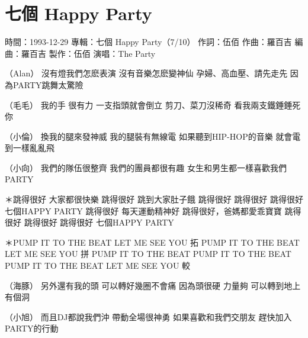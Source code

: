 \documentclass[UTF8,a4paper,oneside,twocolumn,12pt]{ctexbook}
\newcommand{\infopair}[2]{\textbullet #1：#2}
\newcommand{\zc}[1][伍佰]{\infopair{作詞}{#1}}
\newcommand{\zq}[1][伍佰]{\infopair{作曲}{#1}}
\newcommand{\bq}[1][伍佰]{\infopair{編曲}{#1}}
\newcommand{\zj}[1]{\infopair{專輯}{#1}}
\newcommand{\zz}[1]{\infopair{製作}{#1}}
\newcommand{\sj}[1]{\infopair{時間}{#1}}
\newenvironment{info}{\begin{flushleft}\kaishu
	}
	{\end{flushleft}\normalsize\yahei\par}
\newenvironment{lyric}{
	}
{}
\begin{document}
\section{七個 Happy Party}
\begin{info}
	\sj{1993-12-29}
	\zj{七個 Happy Party（7/10）}
	\zc
	\zq[羅百吉]
	\bq[羅百吉]
	\zz{伍佰}
	\infopair{演唱}{The Party}
\end{info}
\begin{lyric}
	（Alan）
	沒有燈我們怎麽表演 沒有音樂怎麽變神仙
	孕婦、高血壓、請先走先 因為PARTY跳舞太驚險

	（毛毛）
	我的手 很有力 一支指頭就會倒立
	剪刀、菜刀沒稀奇 看我兩支鐵錘錘死你

	（小倫）
	換我的腿來發神威 我的腿裝有無線電
	如果聽到HIP-HOP的音樂 就會電到一樣亂亂飛

	（小向）
	我們的隊伍很整齊 我們的團員都很有趣
	女生和男生都一樣喜歡我們PARTY

	＊跳得很好 大家都很快樂 跳得很好 跳到大家肚子餓
	跳得很好 跳得很好 跳得很好 七個HAPPY PARTY
	跳得很好 每天運動精神好 跳得很好，爸媽都愛乖寶寶
	跳得很好 跳得很好 跳得很好 七個HAPPY PARTY

	＊PUMP IT TO THE BEAT LET ME SEE YOU 拓
	PUMP IT TO THE BEAT LET ME SEE YOU 拼
	PUMP IT TO THE BEAT PUMP IT TO THE BEAT
	PUMP IT TO THE BEAT LET ME SEE YOU 較

	（海豚）
	另外還有我的頭 可以轉好幾圈不會痛
	因為頭很硬 力量夠 可以轉到地上有個洞

	（小旭）
	而且DJ都說我們沖 帶動全場很神勇
	如果喜歡和我們交朋友 趕快加入PARTY的行動
\end{lyric}
\end{document}
